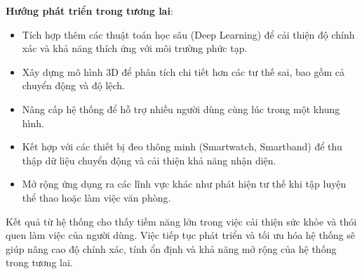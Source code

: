 \documentclass[journal,onecolumn]{IEEEtran}
\begin{document}
\textbf{Hướng phát triển trong tương lai}:
\begin{itemize}
    \item Tích hợp thêm các thuật toán học sâu (Deep Learning) để cải thiện độ chính xác và khả năng thích ứng với môi trường phức tạp.
    \item Xây dựng mô hình 3D để phân tích chi tiết hơn các tư thế sai, bao gồm cả chuyển động và độ lệch.
    \item Nâng cấp hệ thống để hỗ trợ nhiều người dùng cùng lúc trong một khung hình.
    \item Kết hợp với các thiết bị đeo thông minh (Smartwatch, Smartband) để thu thập dữ liệu chuyển động và cải thiện khả năng nhận diện.
    \item Mở rộng ứng dụng ra các lĩnh vực khác như phát hiện tư thế khi tập luyện thể thao hoặc làm việc văn phòng.
\end{itemize}

Kết quả từ hệ thống cho thấy tiềm năng lớn trong việc cải thiện sức khỏe và thói quen làm việc của người dùng. Việc tiếp tục phát triển và tối ưu hóa hệ thống sẽ giúp nâng cao độ chính xác, tính ổn định và khả năng mở rộng của hệ thống trong tương lai.
\end{document}

